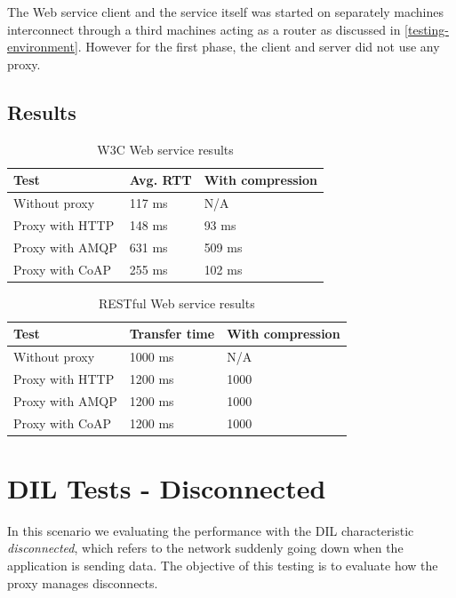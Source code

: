 The Web service client and the service itself was started on separately machines
interconnect through a third machines acting as a router as discussed in
\cref{testing-environment}. However for the first phase, the client and server
did not use any proxy.


\subsection{Results}

\begin{table}[h!]
\begin{tabular}{| l | l | l |}
\hline
  \textbf{Test} & \textbf{Avg. RTT} & \textbf{With compression}\\ \hline
  Without proxy & 117 ms & N/A \\ \hline
  Proxy with HTTP & 148 ms & 93 ms \\ \hline
  Proxy with AMQP & 631 ms & 509 ms \\ \hline
  Proxy with CoAP & 255 ms & 102 ms \\ \hline
\end{tabular}
\caption{W3C Web service results}
\end{table}

\begin{table}[h!]
\begin{tabular}{| l | l | l |}
\hline
  \textbf{Test} & \textbf{Transfer time} & \textbf{With compression}\\ \hline
  Without proxy & 1000 ms & N/A \\ \hline
  Proxy with HTTP & 1200 ms & 1000\\ \hline
  Proxy with AMQP & 1200 ms & 1000\\ \hline
  Proxy with CoAP & 1200 ms & 1000\\ \hline
\end{tabular}
\caption{RESTful Web service results}
\end{table}


\section{DIL Tests - Disconnected}

In this scenario we evaluating the performance with the DIL characteristic
\textit{disconnected}, which refers to the network suddenly going down when the
application is sending data. The objective of this testing is to evaluate how
the proxy manages disconnects.

